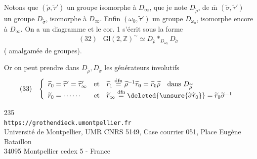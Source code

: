 Notons que $(\widetilde\rho,\widetilde\tau')$  un groupe isomorphe à $D_\infty$, que je note $D_{\widetilde\rho}$,
de $\overline{\mathrm m}$ $(\widetilde\sigma,\widetilde\tau')$  un groupe $D_{\widetilde\sigma}$,
isomorphe à $D_\infty$. Enfin $(\omega_0,\widetilde\tau')$  un groupe $D_{\omega_0}$, isomorphe encore à $D_\infty$. On a un diagramme
et le cor. 1 s'écrit sous la forme
\[
\begin{array}{ll}
(32)&\mathrm{Gl}(2,\mathbb Z)^{\sim}\simeq D_{\widetilde\rho}*_{D_{\omega_0}}D_{\widetilde\sigma}
\end{array}
\]
( amalgamée de groupes).

Or on peut prendre dans $D_{\widetilde\rho},D_{\widetilde\sigma}$ les générateurs involutifs
\[
\begin{array}{ll}
(33)&\left\{\begin{array}{lll}
\widetilde r_0=\widetilde\tau'=\widetilde\tau'_\infty&\text{et}&
\widetilde r_1\overset{\mathrm{dfn}}{=}\widetilde\rho^{-1}\widetilde r_0=\widetilde r_0\widetilde\rho\quad\text{dans }D_{\widetilde\rho}\\
\widetilde r_0=\cdots\cdots&\text{et}&
\widetilde r_\infty\overset{\mathrm{dfn}}{=}\deleted{\unsure{\widetilde\sigma\widetilde r_0}}=\widetilde r_0\widetilde\sigma^{-1}
\end{array}\right.
\end{array}
\]


\begin{center}
235\\
\texttt{https://grothendieck.umontpellier.fr}\\
Université de Montpellier, UMR CNRS 5149, Case courrier 051, Place Eugène Bataillon\\
34095 Montpellier cedex 5 - France
\end{center}

